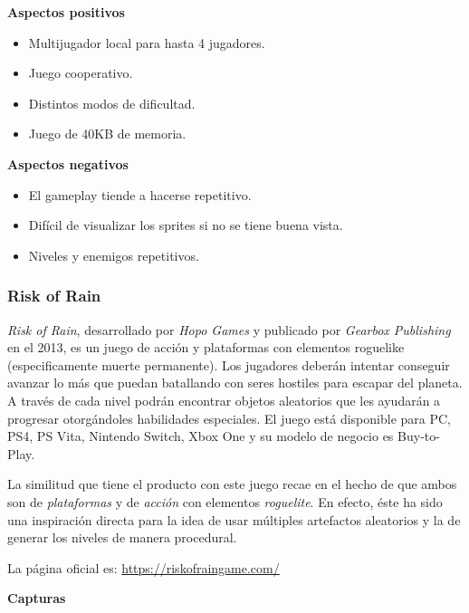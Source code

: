 \textbf{Aspectos positivos}
\begin{itemize}
    \item Multijugador local para hasta 4 jugadores.
    \item Juego cooperativo.
    \item Distintos modos de dificultad.
    \item Juego de 40KB de memoria.
\end{itemize}

\textbf{Aspectos negativos}
\begin{itemize}
    \item El gameplay tiende a hacerse repetitivo.
    \item Difícil de visualizar los sprites si no se tiene buena vista.
    \item Niveles y enemigos repetitivos.
\end{itemize}

\subsubsection{Risk of Rain}

\emph{Risk of Rain}, desarrollado por \emph{Hopo Games} y publicado por
\emph{Gearbox Publishing} en el 2013, es un juego de acción y plataformas con
elementos roguelike (especificamente muerte permanente). Los jugadores deberán
intentar conseguir avanzar lo más que puedan batallando con seres hostiles para
escapar del planeta. A través de cada nivel podrán encontrar objetos aleatorios
que les ayudarán a progresar otorgándoles habilidades especiales. El juego está
disponible para PC, PS4, PS Vita, Nintendo Switch, Xbox One y su modelo de
negocio es Buy-to-Play.

La similitud que tiene el producto con este juego recae en el hecho de que ambos
son de \emph{plataformas} y de \emph{acción} con elementos \emph{roguelite}. En
efecto, éste ha sido una inspiración directa para la idea de usar múltiples
artefactos aleatorios y la de generar los niveles de manera procedural.

La página oficial es:
\url{https://riskofraingame.com/}

\textbf{Capturas}

